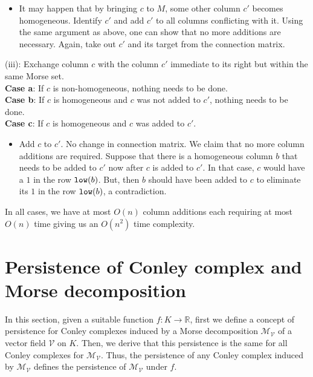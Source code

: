 \documentclass[a4paper,english,cleveref]{article}
\theoremstyle{plain}
\newcounter{li}
\newcommand{\low}{{\tt low}}
\begin{document}
{{\begin{itemize}
\begin{itemize}
with the same $\low(c')$ because $\low(c) < \low(c')$ (because $\low(c')$ is in $M$ and $\low(c)$ is to the left of $M$.
\item If $c'$ were non-homogeneous, adding $c$ to it cannot make it homogeneous because the new $\low(c')$ can at best be moved down to $\low(c)$ which keeps $c'$ non-homogeneous.
\item Above observations mean that no changes are required for the connection matrix due to additions of $c$ to $c'$.
\end{itemize}
    \item It may happen that by bringing $c$ to $M$, some other column $c'$ becomes homogeneous. Identify $c'$ and add $c'$ to all columns conflicting with it. Using the same argument as above, one can show that no more additions are necessary. Again, take out $c'$ and its target from the connection matrix.
\end{itemize}
(iii): Exchange column $c$ with the column $c'$ immediate to its right but within the same Morse set.\\
{\bf Case a}: If $c$ is non-homogeneous, nothing needs to be done.\\
{\bf Case b}: If $c$ is homogeneous and $c$ was not added to $c'$, nothing needs to be done.\\
{\bf Case c}: If $c$ is homogeneous and $c$ was added to $c'$.
\begin{itemize}
    \item Add $c$ to $c'$. No change in connection matrix. We claim that no more
column additions are required. Suppose that there is a homogeneous column
$b$ that needs to be added to $c'$ now after $c$ is added to $c'$. In that case, $c$ would have a $1$ in the row $\low(b)$. But, then $b$ should have been added to $c$ to eliminate its $1$ in the row $\low(b)$, a contradiction.
\end{itemize}
In all cases, we have at most $O(n)$ column additions each requiring at most $O(n)$ time giving us an $O(n^2)$ time complexity.}
}

\section{Persistence of Conley complex and Morse decomposition} \label{sec:persistence}
In this section, given a suitable function $f:K\rightarrow \mathbb{R}$, first we define a concept of persistence for Conley complexes induced by a Morse decomposition $\mathcal M_{\mathcal V}$ of a vector field $\mathcal V$ on $K$. Then, we derive that
this persistence is the same for all Conley complexes for $\mathcal M_{\mathcal V}$. Thus, the
persistence of any Conley complex induced by $\mathcal M_{\mathcal V}$ defines the persistence of $\mathcal M_{\mathcal V}$ under $f$.
\end{document}
